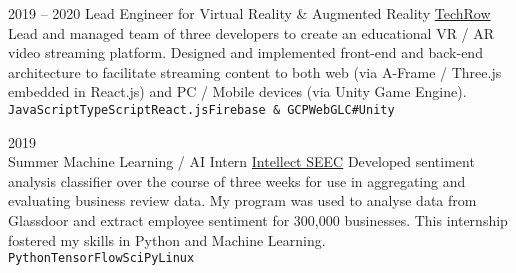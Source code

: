 \documentclass[9pt]{developercv} %
\begin{document}
\begin{entrylist}
	\entry
	{2019 -- 2020}
	{Lead Engineer for Virtual Reality \& Augmented Reality}
	{\href{https://www.techrow.org}{TechRow}}
	{
		Lead and managed team of three developers to create an educational VR / AR video streaming platform.
		Designed and implemented front-end and back-end architecture to facilitate streaming content to both web (via A-Frame / Three.js embedded in React.js) and PC / Mobile devices (via Unity Game Engine).
		\\
		\texttt{JavaScript}\slashsep\texttt{TypeScript}\slashsep\texttt{React.js}\slashsep\texttt{Firebase \& GCP}\slashsep\texttt{WebGL}\slashsep\texttt{C\#}\slashsep\texttt{Unity}
	}

	\entry
	{
		2019
		\\
		\footnotesize{Summer}
	}
	{Machine Learning / AI Intern}
	{\href{https://intellectseec.com}{Intellect SEEC}}
	{
		Developed sentiment analysis classifier over the course of three
		weeks for use in aggregating and evaluating business review data.
		My program was used to analyse data from Glassdoor and extract
		employee sentiment for 300,000 businesses. This internship fostered my skills in
		Python and Machine Learning.
		\\ \texttt{Python}\slashsep\texttt{TensorFlow}\slashsep\texttt{SciPy}\slashsep\texttt{Linux}
	}

\end{entrylist}
\end{document}
